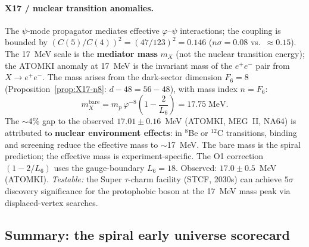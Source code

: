 \documentclass[12pt,a4paper]{article}
\begin{document}
\paragraph{X17 / nuclear transition anomalies.}
The $\psi$-mode propagator mediates effective $\varphi$--$\psi$ interactions; the coupling is bounded by $(C(5)/C(4))^2 = (47/123)^2 = 0.146$ ($n\sigma = 0.08$ vs.\ $\approx 0.15$). The 17~MeV scale is the \textbf{mediator mass} $m_X$ (not the nuclear transition energy); the ATOMKI anomaly at 17~MeV is the invariant mass of the $e^+e^-$ pair from $X \to e^+e^-$. The mass arises from the dark-sector dimension $F_6 = 8$ (Proposition~\ref{prop:X17-n8}: $d - 48 = 56 - 48$), with mass index $n = F_6$:
\begin{equation}
m_X^{\mathrm{bare}} = m_p\,\varphi^{-8}\left(1 - \frac{2}{L_6}\right) = 17.75\;\mathrm{MeV}.
\end{equation}
The $\sim$4\% gap to the observed $17.01 \pm 0.16$~MeV (ATOMKI, MEG~II, NA64) is attributed to \textbf{nuclear environment effects}: in $^8$Be or $^{12}$C transitions, binding and screening reduce the effective mass to $\sim$17~MeV. The bare mass is the spiral prediction; the effective mass is experiment-specific.
The O1 correction $(1 - 2/L_6)$ uses the gauge-boundary $L_6 = 18$. Observed: $17.0 \pm 0.5$~MeV (ATOMKI). \textit{Testable:} the Super $\tau$-charm facility (STCF, 2030s) can achieve $5\sigma$ discovery significance for the protophobic boson at the 17~MeV mass peak via displaced-vertex searches.

\subsection{Summary: the spiral early universe scorecard}
\end{document}
